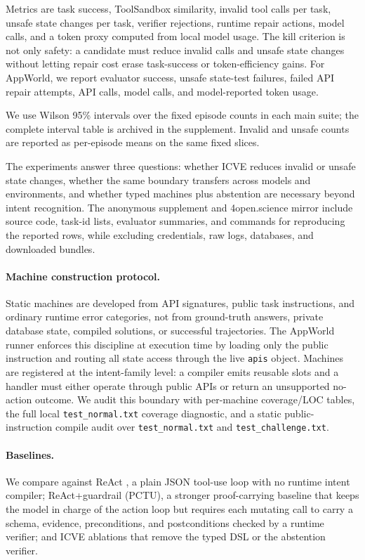 \documentclass[11pt]{article}
\begin{document}
Metrics are task success, ToolSandbox similarity, invalid tool calls per task, unsafe
state changes per task, verifier rejections, runtime repair actions, model calls, and a
token proxy computed from local model usage. The kill criterion is not only safety: a
candidate must reduce invalid calls and unsafe state changes without letting repair cost
erase task-success or token-efficiency gains.
For AppWorld, we report evaluator success, unsafe state-test failures, failed API repair
attempts, API calls, model calls, and model-reported token usage.

We use Wilson 95\% intervals over the fixed episode counts in each main suite; the
complete interval table is archived in the supplement. Invalid and unsafe counts are
reported as per-episode means on the same fixed slices.

The experiments answer three questions: whether ICVE reduces invalid or unsafe state
changes, whether the same boundary transfers across models and environments, and whether
typed machines plus abstention are necessary beyond intent recognition.
The anonymous supplement and 4open.science mirror include source code, task-id lists,
evaluator summaries, and commands for reproducing the reported rows, while excluding
credentials, raw logs, databases, and downloaded bundles.

\paragraph{Machine construction protocol.}
Static machines are developed from API signatures, public task instructions, and
ordinary runtime error categories, not from ground-truth answers, private database state,
compiled solutions, or successful trajectories. The AppWorld runner enforces this
discipline at execution time by loading only the public instruction and routing all state
access through the live \texttt{apis} object. Machines are registered at the intent-family
level: a compiler emits reusable slots and a handler must either operate through public
APIs or return an unsupported no-action outcome. We audit this boundary with per-machine
coverage/LOC tables, the full local \texttt{test\_normal.txt} coverage diagnostic, and a
static public-instruction compile audit over \texttt{test\_normal.txt} and
\texttt{test\_challenge.txt}.

\paragraph{Baselines.}
We compare against ReAct \citep{yao2022react}, a plain JSON tool-use loop with no runtime
intent compiler; ReAct+guardrail (PCTU), a stronger proof-carrying baseline that keeps
the model in charge of the action loop but requires each mutating call to carry a schema,
evidence, preconditions, and postconditions checked by a runtime verifier; and ICVE
ablations that remove the typed DSL or the abstention verifier.
\end{document}
